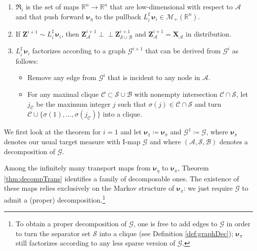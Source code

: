 \documentclass[twoside,11pt]{article}
\newcommand{\orth}{ \perp\!\!\!\perp }  %
\newcommand{\borelm}{\mathscr{M}}
\newcommand{\borelmp}{\borelm_+}
\newcommand{\genm}{\boldsymbol{\nu} }   %
\newcommand{\re}{\mathbb{R}}
\newcommand{\ra}{\rightarrow}
\newcommand{\Bc}{\mathcal{B}}
\newcommand{\Cc}{\mathcal{C}}
\newcommand{\Ac}{\mathcal{A}}
\newcommand{\Sc}{\mathcal{S}}
\newcommand{\Xb}{\boldsymbol{X}}
\newcommand{\Zb}{\boldsymbol{Z}}
\newcommand{\Gcb}{\boldsymbol{\mathcal{G}}}
\newcommand{\lmap}{L} %
\newcommand{\Aset}{ \Ac }
\newcommand{\Bset}{ \Bc }
\newcommand{\Sset}{ \Sc }
\newcommand{\pull}{^\sharp}
\begin{document}
\begin{theorem}
\begin{enumerate}
\begin{enumerate}
      \item 
      \label{thm:decompTrans_partRightMap}
      $\mathfrak{R}_i$ is the set of maps
      $\re^n\ra \re^n$ that are low-dimensional 
      with respect to $\Aset$ and 
      that push forward $\genm_\eta$ to the pullback 
      $\lmap_i\pull \, \genm_i \in  \borelmp(\re^n)$.
      \item 
      \label{thm:decompTrans_partRVimap}
      If 
      $\Zb^{i+1} \sim \lmap_i\pull \, \genm_i$, 
      then
      $\Zb^{i+1}_{\Aset} \orth \Zb^{i+1}_{\Sset \cup \Bset}$ and %
      $\Zb^{i+1}_{\Aset}=\Xb_{\Aset} $ in distribution.
      \item 
      \label{graphSparsification_partImap}
                $\lmap_i\pull \,\genm_i$ factorizes according to
                a graph $\Gcb^{i+1}$ that can be derived from $\Gcb^i$
                  as follows: 

                \begin{itemize}[label={--}]
                    \item Remove any edge from $\Gcb^i$ that is
                    incident to any node in $\Aset$.  

                    \item
                    For any maximal clique $\Cc \subset \Sset \cup \Bset$ with
                    nonempty intersection
                    $\Cc \cap \Sset$, 
                    let $j_{\Cc}$ be the maximum integer $j$ such that 
                    $\sigma(j) \in  \Cc \cap \Sset$
                    and turn $\Cc \cup \{ \sigma(1) ,\ldots, \sigma(j_{\Cc})\}$ into a
                    clique.
                \end{itemize}  
    \end{enumerate}
\end{enumerate}
\end{theorem}

We first look at the theorem for $i=1$ and let 
$\genm_1 \coloneqq \genm_\pi$ and $\Gcb^1 \coloneqq \Gcb$,
where 
%
%
$\genm_\pi$ denotes our usual target measure with I-map $\Gcb$ and where $(\Aset ,\Sset, \Bset)$
denotes a decomposition of $\Gcb$.

Among the infinitely many transport maps from $\genm_\eta$ to  $\genm_\pi$, 
%
Theorem \ref{thm:decompTrans} identifies a family of decomposable ones. 
%
The existence of these maps relies exclusively 
on the
Markov structure of $\genm_\pi$: we just require $\Gcb$ to 
admit a (proper) decomposition.\footnote{
To obtain a proper decomposition
%
%
of $\Gcb$, one is free to add edges to $\Gcb$ 
in order to turn the separator set $\Sset$ into a clique (see Definition \ref{def:graphDec});
$\genm_\pi$  still factorizes according to any less sparse
version of $\Gcb$.
%
%
%
%
%
%
%
%
}
%
%
%
\end{document}

